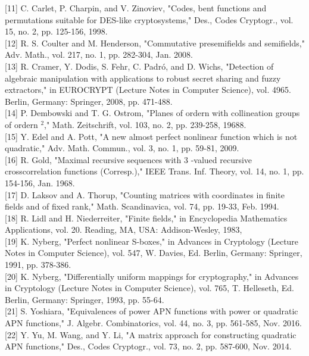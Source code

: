 \documentclass[10pt]{article}
\begin{document}
[11] C. Carlet, P. Charpin, and V. Zinoviev, "Codes, bent functions and permutations suitable for DES-like cryptosystems," Des., Codes Cryptogr., vol. 15, no. 2, pp. 125-156, 1998.\\[0pt]
[12] R. S. Coulter and M. Henderson, "Commutative presemifields and semifields," Adv. Math., vol. 217, no. 1, pp. 282-304, Jan. 2008.\\[0pt]
[13] R. Cramer, Y. Dodis, S. Fehr, C. Padró, and D. Wichs, "Detection of algebraic manipulation with applications to robust secret sharing and fuzzy extractors," in EUROCRYPT (Lecture Notes in Computer Science), vol. 4965. Berlin, Germany: Springer, 2008, pp. 471-488.\\[0pt]
[14] P. Dembowski and T. G. Ostrom, "Planes of ordern with collineation groups of ordern ${ }^{2}$," Math. Zeitschrift, vol. 103, no. 2, pp. 239-258, 19688.\\[0pt]
[15] Y. Edel and A. Pott, "A new almost perfect nonlinear function which is not quadratic," Adv. Math. Commun., vol. 3, no. 1, pp. 59-81, 2009.\\[0pt]
[16] R. Gold, "Maximal recursive sequences with 3 -valued recursive crosscorrelation functions (Corresp.)," IEEE Trans. Inf. Theory, vol. 14, no. 1, pp. 154-156, Jan. 1968.\\[0pt]
[17] D. Laksov and A. Thorup, "Counting matrices with coordinates in finite fields and of fixed rank," Math. Scandinavica, vol. 74, pp. 19-33, Feb. 1994.\\[0pt]
[18] R. Lidl and H. Niederreiter, "Finite fields," in Encyclopedia Mathematics Applications, vol. 20. Reading, MA, USA: Addison-Wesley, 1983,\\[0pt]
[19] K. Nyberg, "Perfect nonlinear S-boxes," in Advances in Cryptology (Lecture Notes in Computer Science), vol. 547, W. Davies, Ed. Berlin, Germany: Springer, 1991, pp. 378-386.\\[0pt]
[20] K. Nyberg, "Differentially uniform mappings for cryptography," in Advances in Cryptology (Lecture Notes in Computer Science), vol. 765, T. Helleseth, Ed. Berlin, Germany: Springer, 1993, pp. 55-64.\\[0pt]
[21] S. Yoshiara, "Equivalences of power APN functions with power or quadratic APN functions," J. Algebr. Combinatorics, vol. 44, no. 3, pp. 561-585, Nov. 2016.\\[0pt]
[22] Y. Yu, M. Wang, and Y. Li, "A matrix approach for constructing quadratic APN functions," Des., Codes Cryptogr., vol. 73, no. 2, pp. 587-600, Nov. 2014.
\end{document}
